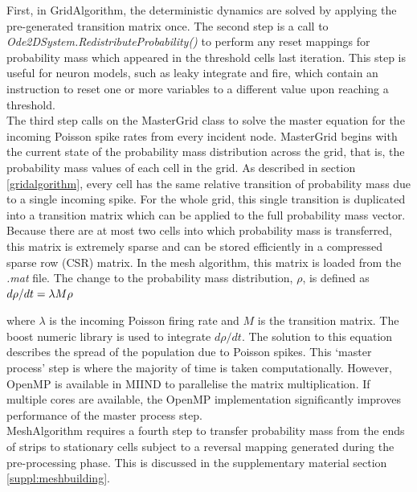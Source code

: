 \documentclass[utf8]{frontiersSCNS} %
\begin{document}
First, in GridAlgorithm, the deterministic dynamics are solved by applying the pre-generated transition matrix once. The second step is a call to \textit{Ode2DSystem.RedistributeProbability()} to perform any reset mappings for probability mass which appeared in the threshold cells last iteration. This step is useful for neuron models, such as leaky integrate and fire, which contain an instruction to reset one or more variables to a different value upon reaching a threshold.\\

The third step calls on the MasterGrid class to solve the master equation for the incoming Poisson spike rates from every incident node. MasterGrid begins with the current state of the probability mass distribution across the grid, that is, the probability mass values of each cell in the grid. As described in section \ref{gridalgorithm}, every cell has the same relative transition of probability mass due to a single incoming spike. For the whole grid, this single transition is duplicated into a transition matrix which can be applied to the full probability mass vector. Because there are at most two cells into which probability mass is transferred, this matrix is extremely sparse and can be stored efficiently in a compressed sparse row (CSR) matrix. In the mesh algorithm, this matrix is loaded from the \textit{.mat} file. The change to the probability mass distribution, $\rho$, is defined as \\

$d\rho/dt = \lambda M \rho \\$

where $\lambda$ is the incoming Poisson firing rate and $M$ is the transition matrix. The boost numeric library is used to integrate $d\rho/dt$. The solution to this equation describes the spread of the population due to Poisson spikes. This `master process' step is where the majority of time is taken computationally. However, OpenMP is available in MIIND to parallelise the matrix multiplication. If multiple cores are available, the OpenMP implementation significantly improves performance of the master process step.\\

MeshAlgorithm requires a fourth step to transfer probability mass from the ends of strips to stationary cells subject to a reversal mapping generated during the pre-processing phase. This is discussed in the supplementary material section \ref{suppl:meshbuilding}.\\
\end{document}
